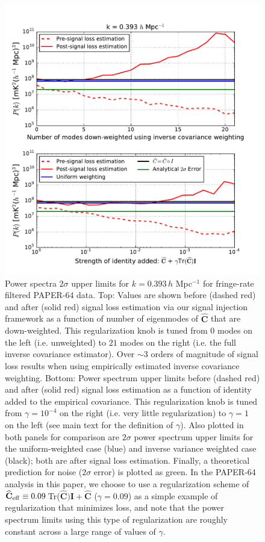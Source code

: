 \documentclass[preprint2,numberedappendix,tighten]{aastex6}  %
\begin{document}
\begin{figure}
	\centering
	\includegraphics[width=1\textwidth]{plots/sigloss_modeloop_2panel.pdf}
	\caption{Power spectra $2\sigma$ upper limits for $k=0.393$\,$h$ Mpc$^{-1}$ for fringe-rate filtered PAPER-64 data. Top: Values 
are shown before (dashed red) and after (solid red) signal loss estimation via our signal injection framework as a function of number of eigenmodes of $\widehat{\textbf{C}}$ that 
are down-weighted. This regularization knob is tuned from $0$ modes on the left (i.e. unweighted) to $21$ modes on the right (i.e. the full inverse 
covariance estimator). Over $\sim3$ orders of magnitude of signal loss results when using empirically estimated inverse covariance weighting. Bottom: Power spectrum upper limits before (dashed red) and after (solid red) signal loss estimation as a function of identity added to the empirical covariance. This regularization knob is tuned from $\gamma = 10^{-4}$ on the right (i.e. very little regularization) to $\gamma = 1$ on the left (see main text for the definition of $\gamma$). Also 
plotted in both panels for comparison are $2\sigma$ power spectrum upper limits for the uniform-weighted case (blue) and inverse variance 
weighted case (black); both are after signal loss estimation. Finally, a theoretical prediction for noise ($2\sigma$ error) is plotted 
as green. In the PAPER-64 analysis in this paper, we choose to use a regularization scheme of $\widehat{\textbf{C}}_{\rm eff} \equiv 0.09 \, $Tr($\widehat{\textbf{C}})\textbf{I} + \widehat{\textbf{C}}$ ($\gamma = 0.09$) as a simple example of regularization that minimizes loss, and note that the power spectrum limits using this type of regularization are roughly constant across a large range of values of $\gamma$.}
	\label{fig:sigloss_modeloop}
\end{figure}
\end{document}
